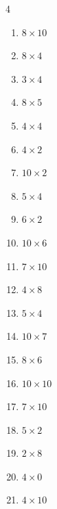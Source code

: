 \begin{multicols}{4}
\begin{enumerate}
  \item $8\times 10$
        \phantom{$=80$}

  \item $8\times 4$
        \phantom{$=32$}

  \item $3\times 4$
        \phantom{$=12$}

  \item $8\times 5$
        \phantom{$=40$}

  \item $4\times 4$
        \phantom{$=16$}

  \item $4\times 2$
        \phantom{$=8$}

  \item $10\times 2$
        \phantom{$=20$}

  \item $5\times 4$
        \phantom{$=20$}

  \item $6\times 2$
        \phantom{$=12$}

\columnbreak %

  \item $10\times 6$
        \phantom{$=60$}

  \item $7\times 10$
        \phantom{$=70$}

  \item $4\times 8$
        \phantom{$=32$}

  \item $5\times 4$
        \phantom{$=20$}

  \item $10\times 7$
        \phantom{$=70$}

  \item $8\times 6$
        \phantom{$=48$}

  \item $10\times 10$
        \phantom{$=100$}

  \item $7\times 10$
        \phantom{$=70$}

  \item $5\times 2$
        \phantom{$=10$}

  \item $2\times 8$
        \phantom{$=16$}

  \item $4\times 0$
        \phantom{$=0$}

  \item $4\times 10$
        \phantom{$=40$}


\end{enumerate}
\end{multicols}

